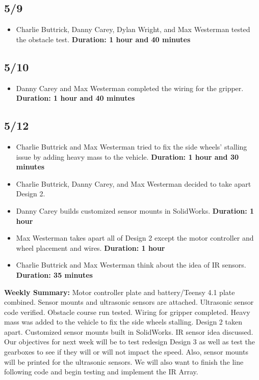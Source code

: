 \documentclass[11pt]{report}
\begin{document}
\subsection*{5/9}

\begin{itemize}
    \item Charlie Buttrick, Danny Carey, Dylan Wright, and Max Westerman tested the obstacle test. \textbf{Duration: 1 hour and 40 minutes}
\end{itemize}

\subsection*{5/10}

\begin{itemize}
    \item Danny Carey and Max Westerman completed the wiring for the gripper. \textbf{Duration: 1 hour and 40 minutes}
\end{itemize}

\subsection*{5/12}

\begin{itemize}
    \item Charlie Buttrick and Max Westerman tried to fix the side wheels' stalling issue by adding heavy mass to the vehicle. \textbf{Duration: 1 hour and 30 minutes}
    \item Charlie Buttrick, Danny Carey, and Max Westerman decided to take apart Design 2.
    \item Danny Carey builds customized sensor mounts in SolidWorks. \textbf{Duration: 1 hour}
    \item Max Westerman takes apart all of Design 2 except the motor controller and wheel placement and wires. \textbf{Duration: 1 hour}
    \item Charlie Buttrick and Max Westerman think about the idea of IR sensors. \textbf{Duration: 35 minutes}
\end{itemize}

\textbf{Weekly Summary:} Motor controller plate and battery/Teensy 4.1 plate combined. Sensor mounts and ultrasonic sensors are attached. Ultrasonic sensor code verified. Obstacle course run tested. Wiring for gripper completed. Heavy mass was added to the vehicle to fix the side wheels stalling. Design 2 taken apart. Customized sensor mounts built in SolidWorks. \gls{IR} sensor idea discussed. Our objectives for next week will be to test redesign Design 3 as well as test the gearboxes to see if they will or will not impact the speed. Also, sensor mounts will be printed for the ultrasonic sensors. We will also want to finish the line following code and begin testing and implement the \gls{IR} Array.
\end{document}
